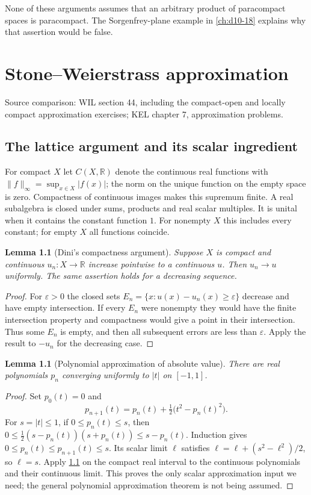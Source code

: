 \documentclass[11pt,oneside,openany]{book}
\newtheorem{lemma}[theorem]{Lemma}
\theoremstyle{definition}
\theoremstyle{remark}
\newcommand{\R}{\mathbb R}\newcommand{\C}{\mathbb C}
\newcommand{\eps}{\varepsilon}
\newcommand{\norm}[1]{\lVert#1\rVert}
\newcommand{\source}[1]{\par\begingroup\small\sffamily\color{black!65}Source comparison: #1\par\endgroup}
\begin{document}
None of these arguments assumes that an arbitrary product of paracompact
spaces is paracompact. The Sorgenfrey-plane example in
\cref{ch:d10-18} explains why that assertion would be false.



\chapter{Stone--Weierstrass approximation}
\label{ch:d10-16}
\source{WIL section 44, including the compact-open and locally compact approximation exercises; KEL chapter 7, approximation problems.}

\section{The lattice argument and its scalar ingredient}
For compact $X$ let $C(X,\R)$ denote the continuous real functions with
$\norm{f}_\infty=\sup_{x\in X}|f(x)|$; the norm on the unique function on
the empty space is zero. Compactness of continuous images makes this
supremum finite. A real subalgebra is closed under sums, products and real
scalar multiples. It is unital when it contains the constant function $1$.
For nonempty $X$ this includes every constant; for empty $X$ all functions
coincide.

\begin{lemma}[Dini's compactness argument]\label{d10:16:dini}
Suppose $X$ is compact and continuous $u_n:X\to\R$ increase pointwise to
a continuous $u$. Then $u_n\to u$ uniformly. The same assertion holds for
a decreasing sequence.
\end{lemma}
\begin{proof}
For $\eps>0$ the closed sets
$E_n=\{x:u(x)-u_n(x)\geq\eps\}$ decrease and have empty intersection.
If every $E_n$ were nonempty they would have the finite intersection
property and compactness would give a point in their intersection.
Thus some $E_n$ is empty, and then all subsequent errors are less than
$\eps$. Apply the result to $-u_n$ for the decreasing case.
\end{proof}

\begin{lemma}[Polynomial approximation of absolute value]\label{d10:16:absolute-polynomial}
There are real polynomials $p_n$ converging uniformly to $|t|$ on $[-1,1]$.
\end{lemma}
\begin{proof}
Set $p_0(t)=0$ and
\[
 p_{n+1}(t)=p_n(t)+\tfrac12\bigl(t^2-p_n(t)^2\bigr).
\]
For $s=|t|\leq1$, if $0\leq p_n(t)\leq s$, then
$0\leq\frac12(s-p_n(t))(s+p_n(t))\leq s-p_n(t)$.
Induction gives $0\leq p_n(t)\leq p_{n+1}(t)\leq s$.
Its scalar limit $\ell$ satisfies $\ell=\ell+(s^2-\ell^2)/2$,
so $\ell=s$. Apply \cref{d10:16:dini} on the compact real interval
to the continuous polynomials and their continuous limit.
This proves the only scalar approximation input we need; the general
polynomial approximation theorem is not being assumed.
\end{proof}
\end{document}
